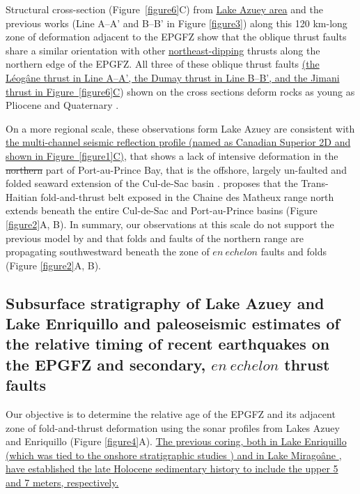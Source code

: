 \documentclass[linenumbers,draft]{agujournal}
\begin{document}
Structural cross-section (Figure~\ref{figure6}C) from \ul{Lake Azuey area} and the previous works \citep{massoni1955haiti,bourgueil1988synthese,cox2011shear,douilly2015three} (Line A--A' and B--B' in Figure \ref{figure3}) along this 120 km-long zone of deformation adjacent to the EPGFZ show that the oblique thrust faults share a similar orientation with other \underline{northeast-dipping} thrusts along the northern edge of the EPGFZ. All three of these oblique thrust faults \ul{(the L\'eog\^ane thrust in Line A--A', the Dumay thrust in Line B--B', and the Jimani thrust in}\underline{ Figure~\ref{figure6}C}) shown on the cross sections deform rocks as young as Pliocene and Quaternary \citep{saint2015seismotectonics}. 

On a more regional scale, these observations form Lake Azuey are consistent with \ul{the multi-channel seismic reflection profile (named as Canadian Superior 2D and shown in Figure~{\ref{figure1}}C)}, that shows a lack of intensive deformation in the \st{northern} part of Port-au-Prince Bay, that is the offshore, largely un-faulted and folded seaward extension of the Cul-de-Sac basin \citep{mchugh2011offshore}. \citet{pubellier2000plate} proposes that the Trans-Haitian fold-and-thrust belt exposed in the Chaine des Matheux range north extends beneath the entire Cul-de-Sac and Port-au-Prince basins (Figure \ref{figure2}A, B). In summary, our observations at this scale do not support the previous model by \citet{pubellier2000plate} and \citet{calais2010transpressional} that folds and faults of the northern range are propagating southwestward beneath the zone of $en~echelon$ faults and folds (Figure \ref{figure2}A, B).

\subsection{Subsurface stratigraphy of Lake Azuey and Lake Enriquillo and paleoseismic estimates of the relative timing of recent earthquakes on the EPGFZ and secondary, $en~echelon$ thrust faults}
Our objective is to determine the relative age of the EPGFZ and its adjacent zone of fold-and-thrust deformation using the sonar profiles from Lakes Azuey and Enriquillo (Figure \ref{figure4}A). \ul{The previous coring, both in Lake Enriquillo} \underline{\citep{rios2013holocene}}\ul{ (which was tied to the onshore stratigraphic studies}\underline{ \citep{taylor1985stratigraphy,rios2013holocene})}\ul{ and in Lake Mirago\^ane}\underline{ \citep{higuera199910},}\ul{ have established the late Holocene sedimentary history to include the upper 5 and 7 meters, respectively.}
\end{document}
